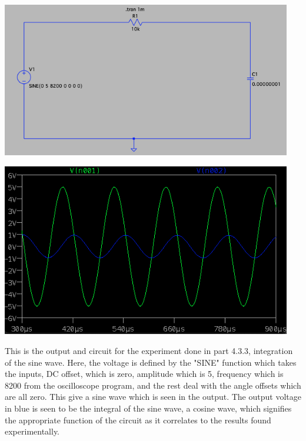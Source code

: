 \documentclass[12pt]{article}
\newcommand{\objects}[2]{%
  \leavevmode\vbox{\hbox{#1}\nointerlineskip\hbox{#2}}%
}
\begin{document}
    \begin{center}
        \objects
            {\includegraphics[width=0.95\textwidth]{4.3.3 LTSpice Circuit.png}}
            \:
            {\includegraphics[width=0.95\textwidth]{4.3.3 LTSpice Output.png}}
    \end{center}
    \par This is the output and circuit for the experiment done in part 4.3.3, integration of the sine wave. Here, the voltage is defined by the "SINE" function which takes the inputs, DC offset, which is zero, amplitude which is 5, frequency which is 8200 from the oscilloscope program, and the rest deal with the angle offsets which are all zero. This give a sine wave which is seen in the output. The output voltage in blue is seen to be the integral of the sine wave, a cosine wave, which signifies the appropriate function of the circuit as it correlates to the results found experimentally.
    \newpage
\end{document}
